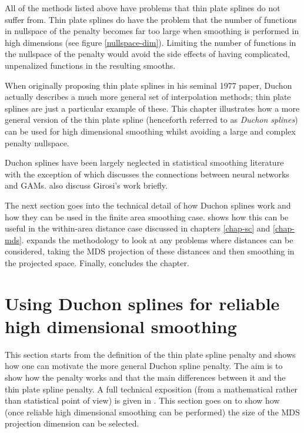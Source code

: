 All of the methods listed above have problems that thin plate splines do not suffer from. Thin plate splines do have the problem that the number of functions in nullspace of the penalty becomes far too large when smoothing is performed in high dimensions (see figure \ref{nullspace-dim}). Limiting the number of functions in the nullspace of the penalty would avoid the side effects of having complicated, unpenalized functions in the resulting smooths. 

When originally proposing thin plate splines in his seminal 1977 paper, Duchon actually describes a much more general set of interpolation methods; thin plate splines are just a particular example of these. This chapter illustrates how a more general version of the thin plate spline (henceforth referred to as \textit{Duchon splines}) can be used for high dimensional smoothing whilst avoiding a large and complex penalty nullspace. 

Duchon splines have been largely neglected in statistical smoothing literature with the exception of  which discusses the connections between neural networks and GAMs.  also discuss Girosi's work briefly.

The next section goes into the technical detail of how Duchon splines work and how they can be used in the finite area smoothing case.  shows how this can be useful in the within-area distance case discussed in chapters \ref{chap-sc} and \ref{chap-mds}.  expands the methodology to look at any problems where distances can be considered, taking the MDS projection of these distances and then smoothing in the projected space. Finally,  concludes the chapter.

\section{Using Duchon splines for reliable high dimensional smoothing}

This section starts from the definition of the thin plate spline penalty and shows how one can motivate the more general Duchon spline penalty. The aim is to show how the penalty works and that the main differences between it and the thin plate spline penalty. A full technical exposition (from a mathematical rather than statistical point of view) is given in . This section goes on to show how (once reliable high dimensional smoothing can be performed) the size of the MDS projection dimension can be selected.

